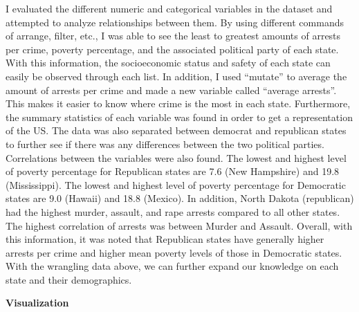 \documentclass[]{article}
\newenvironment{Shaded}{\begin{snugshade}}{\end{snugshade}}
\newcommand{\CommentTok}[1]{\textcolor[rgb]{0.56,0.35,0.01}{\textit{#1}}}
\newcommand{\DataTypeTok}[1]{\textcolor[rgb]{0.13,0.29,0.53}{#1}}
\newcommand{\DecValTok}[1]{\textcolor[rgb]{0.00,0.00,0.81}{#1}}
\newcommand{\KeywordTok}[1]{\textcolor[rgb]{0.13,0.29,0.53}{\textbf{#1}}}
\newcommand{\NormalTok}[1]{#1}
\newcommand{\OperatorTok}[1]{\textcolor[rgb]{0.81,0.36,0.00}{\textbf{#1}}}
\newcommand{\StringTok}[1]{\textcolor[rgb]{0.31,0.60,0.02}{#1}}
\begin{document}
I evaluated the different numeric and categorical variables in the
dataset and attempted to analyze relationships between them. By using
different commands of arrange, filter, etc., I was able to see the least
to greatest amounts of arrests per crime, poverty percentage, and the
associated political party of each state. With this information, the
socioeconomic status and safety of each state can easily be observed
through each list. In addition, I used ``mutate'' to average the amount
of arrests per crime and made a new variable called ``average arrests''.
This makes it easier to know where crime is the most in each state.
Furthermore, the summary statistics of each variable was found in order
to get a representation of the US. The data was also separated between
democrat and republican states to further see if there was any
differences between the two political parties. Correlations between the
variables were also found. The lowest and highest level of poverty
percentage for Republican states are 7.6 (New Hampshire) and 19.8
(Mississippi). The lowest and highest level of poverty percentage for
Democratic states are 9.0 (Hawaii) and 18.8 (Mexico). In addition, North
Dakota (republican) had the highest murder, assault, and rape arrests
compared to all other states. The highest correlation of arrests was
between Murder and Assault. Overall, with this information, it was noted
that Republican states have generally higher arrests per crime and
higher mean poverty levels of those in Democratic states. With the
wrangling data above, we can further expand our knowledge on each state
and their demographics.

\textbf{Visualization}

\begin{Shaded}
\end{Shaded}
\end{document}
